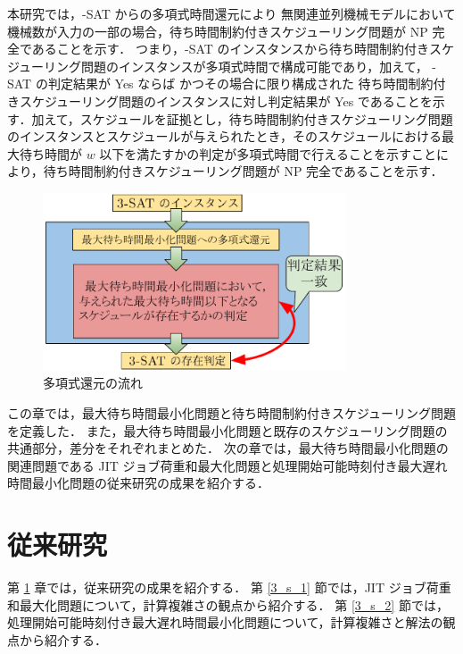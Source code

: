 \documentclass[12pt]{optlab-bachelor}
\begin{document}
本研究では，{-SAT} からの多項式時間還元により 無関連並列機械モデルにおいて機械数が入力の一部の場合，待ち時間制約付きスケジューリング問題が NP 完全であることを示す．
つまり，{-SAT} のインスタンスから待ち時間制約付きスケジューリング問題のインスタンスが多項式時間で構成可能であり，加えて， {-SAT}  の判定結果が Yes ならば
かつその場合に限り構成された 待ち時間制約付きスケジューリング問題のインスタンスに対し判定結果が Yes であることを示す．加えて，スケジュールを証拠とし，待ち時間制約付きスケジューリング問題のインスタンスとスケジュールが与えられたとき，そのスケジュールにおける最大待ち時間が $w$ 以下を満たすかの判定が多項式時間で行えることを示すことにより，待ち時間制約付きスケジューリング問題が NP 完全であることを示す．

\begin{figure}[h]
  \centering
  \includegraphics[width = 9cm]{figure/reduction.pdf}
  \caption{多項式還元の流れ}
\end{figure}

この章では，最大待ち時間最小化問題と待ち時間制約付きスケジューリング問題を定義した．
また，最大待ち時間最小化問題と既存のスケジューリング問題の共通部分，差分をそれぞれまとめた．
次の章では，最大待ち時間最小化問題の関連問題である JIT ジョブ荷重和最大化問題と処理開始可能時刻付き最大遅れ時間最小化問題の従来研究の成果を紹介する．

\chapter{従来研究}\label{c_3}
第 \ref{c_3} 章では，従来研究の成果を紹介する．
第 \ref{3_s_1} 節では，JIT ジョブ荷重和最大化問題について，計算複雑さの観点から紹介する．
第 \ref{3_s_2} 節では，処理開始可能時刻付き最大遅れ時間最小化問題について，計算複雑さと解法の観点から紹介する．
\end{document}
